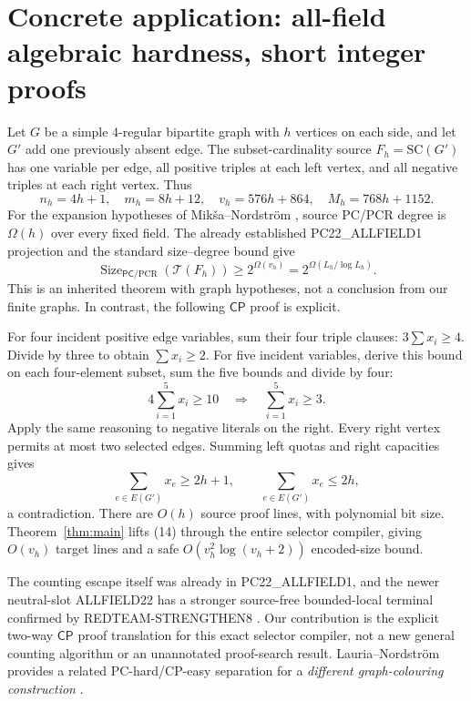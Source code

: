 \documentclass[11pt]{article}
\newcommand{\CP}{\mathsf{CP}}
\newcommand{\PC}{\mathsf{PC}}
\newcommand{\TT}{\mathcal T}
\begin{document}
\section{Concrete application: all-field algebraic hardness, short integer proofs}
Let $G$ be a simple 4-regular bipartite graph with $h$ vertices on each side,
and let $G'$ add one previously absent edge. The subset-cardinality source
$F_h=\mathrm{SC}(G')$ has one variable per edge, all positive triples at each
left vertex, and all negative triples at each right vertex. Thus
\[
       n_h=4h+1,\quad m_h=8h+12,\quad
       v_h=576h+864,\quad M_h=768h+1152.                             \tag{12}
\]
For the expansion hypotheses of Mik\v{s}a--Nordstr\"om
\cite[Theorem 4.8]{mn}, source PC/PCR degree is $\Omega(h)$ over every
fixed field. The already established PC22\_ALLFIELD1 projection and the
standard size--degree bound give
\[
       \operatorname{Size}_{\PC/\mathrm{PCR}}(\TT(F_h))
       \ge 2^{\Omega(v_h)}=2^{\Omega(L_h/\log L_h)}.                  \tag{13}
\]
This is an inherited theorem with graph hypotheses, not a conclusion from
our finite graphs. In contrast, the following $\CP$ proof is explicit.

For four incident positive edge variables, sum their four triple clauses:
$3\sum x_i\ge4$. Divide by three to obtain $\sum x_i\ge2$.
For five incident variables, derive this bound on each four-element subset,
sum the five bounds and divide by four:
\[
                        4\sum_{i=1}^5 x_i\ge10
                        \quad\Longrightarrow\quad\sum_{i=1}^5 x_i\ge3.
\]
Apply the same reasoning to negative literals on the right. Every right
vertex permits at most two selected edges. Summing left quotas and right
capacities gives
\[
                 \sum_{e\in E(G')}x_e\ge2h+1,
                 \qquad \sum_{e\in E(G')}x_e\le2h,                  \tag{14}
\]
a contradiction. There are $O(h)$ source proof lines, with polynomial
bit size. Theorem~\ref{thm:main} lifts (14) through the entire selector
compiler, giving $O(v_h)$ target lines and a safe
$O(v_h^2\log(v_h+2))$ encoded-size bound.

The counting escape itself was already in PC22\_ALLFIELD1, and the newer
neutral-slot ALLFIELD22 has a stronger source-free bounded-local terminal
confirmed by REDTEAM-STRENGTHEN8 \cite{rt8}. Our contribution is the
explicit two-way $\CP$ proof translation for this exact selector compiler,
not a new general counting algorithm or an unannotated proof-search result.
Lauria--Nordstr\"om provides a related PC-hard/CP-easy separation for a
\emph{different graph-colouring construction} \cite[Proposition 1.3]{ln}.
\end{document}
